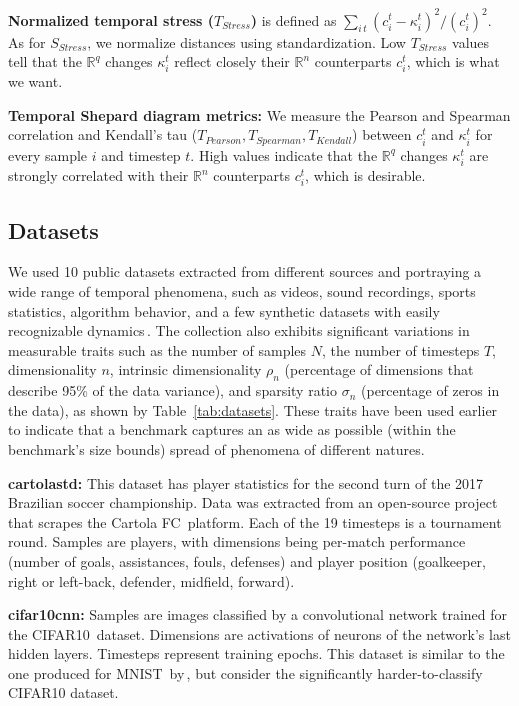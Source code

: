 \noindent\textbf{Normalized temporal stress ($T_{Stress}$)} is defined as $\sum_{i\, t}{(c_{i}^{t}-\kappa_{i}^{t})^{2}} / { (c_{i}^t)^{2}}$. As for $S_{Stress}$, we normalize distances using standardization. Low $T_{Stress}$ values tell that the $\mathbb{R}^q$ changes $\kappa_i^t$ reflect closely their $\mathbb{R}^n$ counterparts ${c_i^t}$, which is what we want.

\noindent\textbf{Temporal Shepard diagram metrics:} We measure the Pearson and Spearman correlation and Kendall's tau ($T_{Pearson}, T_{Spearman}, T_{Kendall}$) 
between $c_i^t$ and $\kappa_i^t$ for every sample $i$ and timestep $t$. High values indicate that the $\mathbb{R}^q$ changes $\kappa_i^t$ are strongly correlated with their $\mathbb{R}^n$ counterparts $c_i^t$, which is desirable.

\subsection{Datasets}
\label{sec:datasets}
%
We used 10 public datasets extracted from different sources and portraying a wide range of temporal phenomena, such as videos, sound recordings, sports statistics, algorithm behavior, and a few synthetic datasets with easily recognizable dynamics\,\cite{repo-guided}. The collection also exhibits significant variations in measurable traits such as the number of samples $N$, the number of timesteps $T$, dimensionality $n$, intrinsic dimensionality $\rho_n$ (percentage of dimensions that describe 95\% of the data variance), and sparsity ratio $\sigma_n$ (percentage of zeros in the data), as shown by Table~\ref{tab:datasets}. These traits have been used earlier\,\cite{Espadoto2019} to indicate that a benchmark captures an as wide as possible (within the benchmark's size bounds) spread of phenomena of different natures.

\noindent\textbf{cartolastd:} This dataset has player statistics for the second turn of the 2017 Brazilian soccer championship. Data was extracted from an open-source project\,\cite{dataset:cartola} that scrapes the Cartola FC\,\cite{cartola} platform. Each of the 19 timesteps is a tournament round. Samples are players, with dimensions being per-match performance (number of goals, assistances, fouls, defenses) and player position (goalkeeper, right or left-back, defender, midfield, forward).

\noindent\textbf{cifar10cnn:} Samples are images classified by a convolutional network trained for the CIFAR10\,\cite{dataset:cifar10} dataset. 
Dimensions are activations of neurons of the network's last hidden layers. Timesteps represent training epochs. This dataset is similar to the one produced for MNIST\,\cite{dataset:mnist} by\,\cite{Rauber2017}, but consider the significantly harder-to-classify CIFAR10 dataset.

